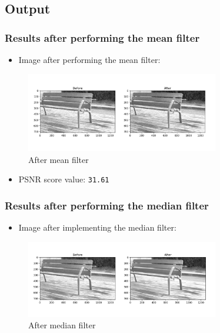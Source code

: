 \documentclass{article}
\begin{document}
\subsection{Output}
\subsubsection{Results after performing the mean filter}
\begin{itemize}
    \item Image after performing the mean filter:
\end{itemize}

\begin{figure}[H]
    \centering
    \includegraphics[width=0.75\textwidth]{before-after-mean}
    \caption{After mean filter}
    \label{before-after-mean}
\end{figure}

\begin{itemize}
    \item PSNR score value: \lstinline{31.61}
\end{itemize}

\subsubsection{Results after performing the median filter}
\begin{itemize}
    \item Image after implementing the median filter:
\end{itemize}

\begin{figure}[H]
    \centering
    \includegraphics[width=0.75\textwidth]{before-after-median}
    \caption{After median filter}
    \label{before-after-median}
\end{figure}
\end{document}
